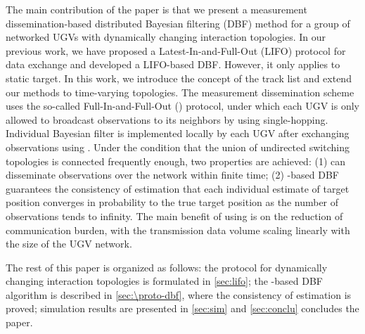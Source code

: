 	The main contribution of the paper is that we present a measurement dissemination-based distributed Bayesian filtering (DBF) method for a group of networked UGVs with dynamically changing interaction topologies. 
	In our previous work, we have proposed a Latest-In-and-Full-Out (LIFO) protocol for data exchange and developed a LIFO-based DBF. 
	However, it only applies to static target.
	In this work, we introduce the concept of the track list and extend our methods to time-varying topologies.
	The measurement dissemination scheme uses the so-called Full-In-and-Full-Out (\proto) protocol, under which each UGV is only allowed to broadcast observations to its neighbors by using single-hopping.
	Individual Bayesian filter is implemented locally by each UGV after exchanging observations using \proto.
	Under the condition that the union of undirected switching topologies is connected frequently enough, two properties are achieved: (1) {\proto} can disseminate observations over the network within finite time; (2) \proto-based DBF guarantees the consistency of estimation that each individual estimate of target position converges in probability to the true target position as the number of observations tends to infinity. 
	The main benefit of using \proto is on the reduction of communication burden, with the transmission data volume scaling linearly with the size of the UGV network. 
	
	The rest of this paper is organized as follows: 
	the {\proto} protocol for dynamically changing interaction topologies is formulated in \cref{sec:lifo};
	the \proto-based DBF algorithm is described in \cref{sec:\proto-dbf}, where the consistency of estimation is proved;
	simulation results are presented in \cref{sec:sim} and \cref{sec:conclu} concludes the paper.
